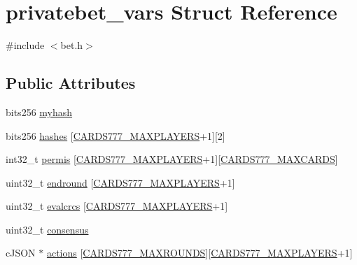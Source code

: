 \hypertarget{structprivatebet__vars}{}\section{privatebet\+\_\+vars Struct Reference}
\label{structprivatebet__vars}


{\ttfamily \#include $<$bet.\+h$>$}

\subsection*{Public Attributes}
\begin{DoxyCompactItemize}
\item 
bits256 \hyperlink{structprivatebet__vars_a3d1f69a4d06de80930cd37e647deb1e9}{myhash}
\item 
bits256 \hyperlink{structprivatebet__vars_a66da046d580bae150ab99dd6a5ac3b55}{hashes} \mbox{[}\hyperlink{common_8h_a97d6188fd175f4ea7268e9445107a7c0}{C\+A\+R\+D\+S777\+\_\+\+M\+A\+X\+P\+L\+A\+Y\+E\+RS}+1\mbox{]}\mbox{[}2\mbox{]}
\item 
int32\+\_\+t \hyperlink{structprivatebet__vars_af2d141af405be918e44dd233bb2c28ce}{permis} \mbox{[}\hyperlink{common_8h_a97d6188fd175f4ea7268e9445107a7c0}{C\+A\+R\+D\+S777\+\_\+\+M\+A\+X\+P\+L\+A\+Y\+E\+RS}+1\mbox{]}\mbox{[}\hyperlink{common_8h_a90f0ea2d767ac1915e44acb24a1fe1bd}{C\+A\+R\+D\+S777\+\_\+\+M\+A\+X\+C\+A\+R\+DS}\mbox{]}
\item 
uint32\+\_\+t \hyperlink{structprivatebet__vars_a1024da5f14f9d2a5feea553160943bc9}{endround} \mbox{[}\hyperlink{common_8h_a97d6188fd175f4ea7268e9445107a7c0}{C\+A\+R\+D\+S777\+\_\+\+M\+A\+X\+P\+L\+A\+Y\+E\+RS}+1\mbox{]}
\item 
uint32\+\_\+t \hyperlink{structprivatebet__vars_a47a408e1bf5e3ac50fb9321a6f00332d}{evalcrcs} \mbox{[}\hyperlink{common_8h_a97d6188fd175f4ea7268e9445107a7c0}{C\+A\+R\+D\+S777\+\_\+\+M\+A\+X\+P\+L\+A\+Y\+E\+RS}+1\mbox{]}
\item 
uint32\+\_\+t \hyperlink{structprivatebet__vars_a4bd5b696098a9133c7d7f6b601c1e061}{consensus}
\item 
c\+J\+S\+ON $\ast$ \hyperlink{structprivatebet__vars_a9cc412a623fde59fcd173ca97b504cde}{actions} \mbox{[}\hyperlink{common_8h_aa7cb3dc82286cdcfc50250b3ec3ae769}{C\+A\+R\+D\+S777\+\_\+\+M\+A\+X\+R\+O\+U\+N\+DS}\mbox{]}\mbox{[}\hyperlink{common_8h_a97d6188fd175f4ea7268e9445107a7c0}{C\+A\+R\+D\+S777\+\_\+\+M\+A\+X\+P\+L\+A\+Y\+E\+RS}+1\mbox{]}
\item 

\end{DoxyCompactItemize}

